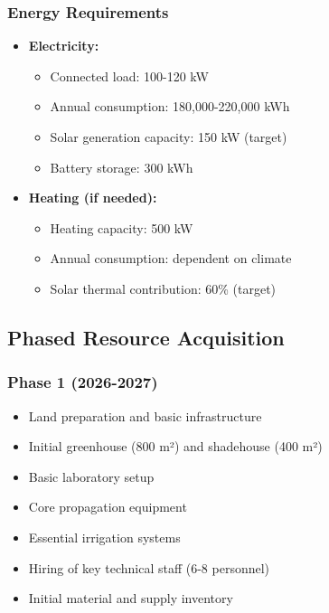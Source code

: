 \subsubsection{Energy Requirements}
\begin{itemize}
    \item \textbf{Electricity:}
    \begin{itemize}
        \item Connected load: 100-120 kW
        \item Annual consumption: 180,000-220,000 kWh
        \item Solar generation capacity: 150 kW (target)
        \item Battery storage: 300 kWh
    \end{itemize}
    
    \item \textbf{Heating (if needed):}
    \begin{itemize}
        \item Heating capacity: 500 kW
        \item Annual consumption: dependent on climate
        \item Solar thermal contribution: 60\% (target)
    \end{itemize}
\end{itemize}

\subsection{Phased Resource Acquisition}

\subsubsection{Phase 1 (2026-2027)}
\begin{itemize}
    \item Land preparation and basic infrastructure
    \item Initial greenhouse (800 m²) and shadehouse (400 m²)
    \item Basic laboratory setup
    \item Core propagation equipment
    \item Essential irrigation systems
    \item Hiring of key technical staff (6-8 personnel)
    \item Initial material and supply inventory
\end{itemize}


